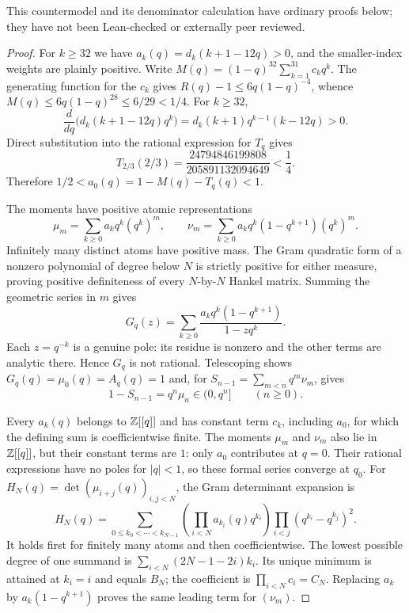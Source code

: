 \documentclass[11pt]{article}
\begin{document}
This countermodel and its denominator calculation have ordinary proofs
below; they have not been Lean-checked or externally peer reviewed.

\begin{proof}
For $k\ge32$ we have $a_k(q)=d_k(k+1-12q)>0$, and the smaller-index
weights are plainly positive.  Write
$M(q)=(1-q)^{32}\sum_{k=1}^{31}c_kq^k$.
The generating function for the $c_k$ gives
$R(q)-1\le6q(1-q)^{-4}$, whence
$M(q)\le6q(1-q)^{28}\le6/29<1/4$.
For $k\ge32$,
\[
 \frac{d}{dq}\bigl(d_k(k+1-12q)q^k\bigr)
   =d_k(k+1)q^{k-1}(k-12q)>0.
\]
Direct substitution into the rational expression for $T_q$ gives
\[
 T_{2/3}(2/3)
   =\frac{24794846199808}{205891132094649}<\frac14.
\]
Therefore $1/2<a_0(q)=1-M(q)-T_q(q)<1$.

The moments have positive atomic representations
\[
 \mu_m=\sum_{k\ge0}a_kq^k(q^k)^m,\qquad
 \nu_m=\sum_{k\ge0}a_kq^k(1-q^{k+1})(q^k)^m.
\]
Infinitely many distinct atoms have positive mass.  The Gram
quadratic form of a nonzero polynomial of degree below $N$ is strictly
positive for either measure, proving positive definiteness of every
$N$-by-$N$ Hankel matrix.  Summing the geometric series in $m$ gives
\[
 G_q(z)=\sum_{k\ge0}\frac{a_kq^k(1-q^{k+1})}{1-zq^k}.
\]
Each $z=q^{-k}$ is a genuine pole: its residue is nonzero and the other
terms are analytic there.  Hence $G_q$ is not rational.  Telescoping
shows $G_q(q)=\mu_0(q)=A_q(q)=1$ and, for
$S_{n-1}=\sum_{m<n}q^m\nu_m$, gives
\[
 1-S_{n-1}=q^n\mu_n\in(0,q^n]
 \qquad(n\ge0).
\]

Every $a_k(q)$ belongs to $\mathbb{Z}[[q]]$ and has constant term $c_k$,
including $a_0$, for which the defining sum is coefficientwise finite.
The moments $\mu_m$ and $\nu_m$ also lie in $\mathbb{Z}[[q]]$, but their
constant terms are $1$: only $a_0$ contributes at $q=0$. Their
rational expressions have no poles for $|q|<1$, so these formal
series converge at $q_0$.
For $H_N(q)=\det(\mu_{i+j}(q))_{i,j<N}$, the Gram determinant expansion is
\[
 H_N(q)=\sum_{0\le k_0<\cdots<k_{N-1}}
     \left(\prod_{i<N}a_{k_i}(q)q^{k_i}\right)
     \prod_{i<j}(q^{k_i}-q^{k_j})^2.
\]
It holds first for finitely many atoms and then coefficientwise.
The lowest possible degree of one summand is
$\sum_{i<N}(2N-1-2i)k_i$.  Its unique minimum is attained at
$k_i=i$ and equals $B_N$; the coefficient is
$\prod_{i<N}c_i=C_N$.  Replacing $a_k$ by
$a_k(1-q^{k+1})$ proves the same leading term for $(\nu_m)$.


\end{proof}
\end{document}
